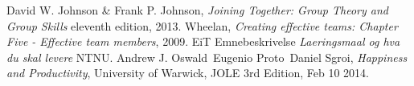 \begin{thebibliography}{99}	%
		David W. Johnson \& Frank P. Johnson,
		\emph{Joining Together: Group Theory and Group Skills}
		eleventh edition,
		2013.
		Wheelan,
		\emph{Creating effective teams: Chapter Five - Effective team members},
		2009.
		EiT Emnebeskrivelse
		\emph{Laeringsmaal og hva du skal levere}
		NTNU.
		Andrew J. Oswald\, Eugenio Proto\, Daniel Sgroi,
		\emph{Happiness and Productivity},
		University of Warwick,
		JOLE 3rd Edition, Feb 10 2014.
\end{thebibliography}